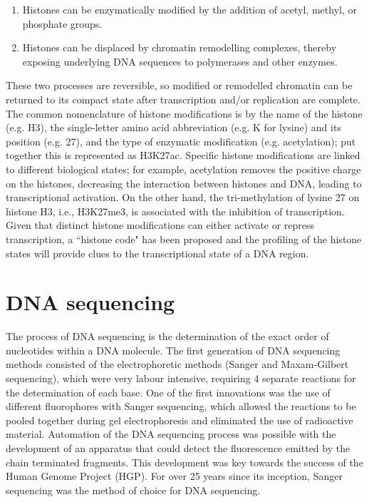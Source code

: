 \begin{enumerate}
   \item Histones can be enzymatically modified by the addition of acetyl, methyl, or phosphate groups.
   \item Histones can be displaced by chromatin remodelling complexes, thereby exposing underlying DNA sequences to polymerases and other enzymes.
\end{enumerate}

These two processes are reversible, so modified or remodelled chromatin can be returned to its compact state after transcription and/or replication are complete. The common nomenclature of histone modifications is by the name of the histone (e.g. H3), the single-letter amino acid abbreviation (e.g. K for lysine) and its position (e.g. 27), and the type of enzymatic modification (e.g. acetylation); put together this is represented as H3K27ac. Specific histone modifications are linked to different biological states; for example, acetylation removes the positive charge on the histones, decreasing the interaction between histones and DNA, leading to transcriptional activation. On the other hand, the tri-methylation of lysine 27 on histone H3, i.e., H3K27me3, is associated with the inhibition of transcription\cite{pmid21652639}. Given that distinct histone modifications can either activate or repress transcription, a ``histone code" has been proposed\cite{pmid11498575} and the profiling of the histone states will provide clues to the transcriptional state of a DNA region.

\section{DNA sequencing}

The process of DNA sequencing is the determination of the exact order of nucleotides within a DNA molecule. The first generation of DNA sequencing methods consisted of the electrophoretic methods (Sanger and Maxam-Gilbert sequencing), which were very labour intensive, requiring 4 separate reactions for the determination of each base. One of the first innovations was the use of different fluorophores with Sanger sequencing, which allowed the reactions to be pooled together during gel electrophoresis and eliminated the use of radioactive material. Automation of the DNA sequencing process was possible with the development of an apparatus that could detect the fluorescence emitted by the chain terminated fragments. This development was key towards the success of the Human Genome Project (HGP). For over 25 years since its inception, Sanger sequencing was the method of choice for DNA sequencing.

